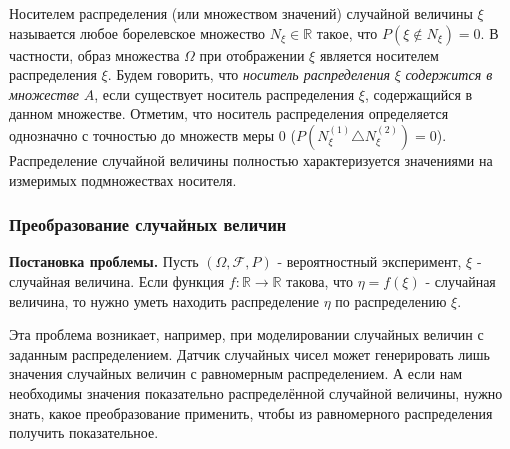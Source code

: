 \begin{definition}
	Носителем распределения (или множеством значений) случайной величины $\xi$ называется любое борелевское множество $N_{\xi} \in \mathbb{R}$ такое, что $P(\xi \notin N_{\xi}) = 0$. В частности, образ множества $\Omega$ при отображении $\xi$ является носителем распределения $\xi$. Будем говорить, что \textit{носитель распределения} $\xi$ \textit{содержится в множестве} $A$, если существует носитель распределения $\xi$, содержащийся в данном множестве. Отметим, что носитель распределения определяется однозначно с точностью до множеств меры 0 ($P(N_{\xi}^{(1)} \triangle N_{\xi}^{(2)}) = 0$). Распределение случайной величины полностью характеризуется значениями на измеримых подмножествах носителя.
\end{definition}

\subsubsection{Преобразование случайных величин}

\noindent\textbf{Постановка проблемы.}
Пусть $(\Omega, \mathcal{F}, P)$ - вероятностный эксперимент, $\xi$ - случайная величина. Если функция $f: \mathbb{R} \to \mathbb{R}$ такова, что $\eta = f(\xi)$ - случайная величина, то нужно уметь находить распределение $\eta$ по распределению $\xi$.

\begin{remark}
	Эта проблема возникает, например, при моделировании случайных величин с заданным распределением. Датчик случайных чисел может генерировать лишь значения случайных величин с равномерным распределением. А если нам необходимы значения показательно распределённой случайной величины, нужно знать, какое преобразование применить, чтобы из равномерного распределения получить показательное.
\end{remark}

